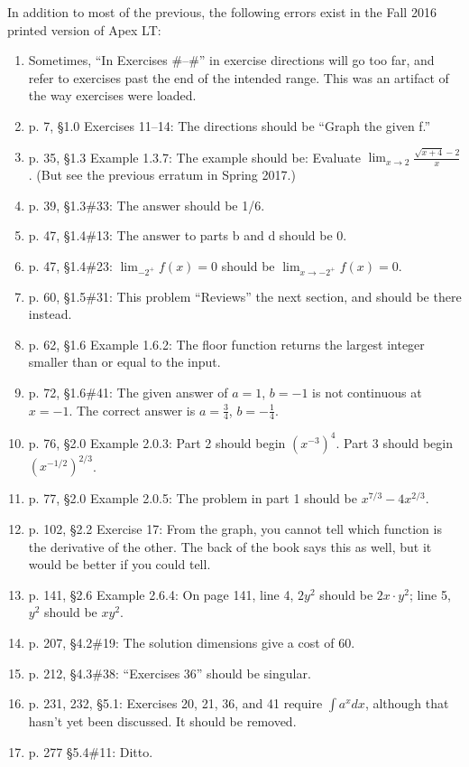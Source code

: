 \documentclass{amsart}
\newcommand{\ds}{\displaystyle}
\begin{document}
In addition to most of the previous, the following errors exist in the Fall 2016 printed version of Apex LT:
\begin{enumerate}
\item Sometimes, ``In Exercises \#--\#'' in exercise directions will go too far, and refer to exercises past the end of the intended range. This was an artifact of the way exercises were loaded.
\item p. 7, \S1.0 Exercises 11--14: The directions should be ``Graph the given f.''
\item p. 35, \S1.3 Example 1.3.7: The example should be: Evaluate $\ds\lim_{x\to2}\frac{\sqrt{x+4}-2}x$. (But see the previous erratum in Spring 2017.)
\item p. 39, \S1.3\#33: The answer should be 1/6.
\item p. 47, \S1.4\#13: The answer to parts b and d should be 0.
\item p. 47, \S1.4\#23: $\ds\lim_{-2^+}f(x)=0$ should be $\ds\lim_{x\to-2^+}f(x)=0$.
\item p. 60, \S1.5\#31: This problem ``Reviews'' the next section, and should be there instead.
\item p. 62, \S1.6 Example 1.6.2: The floor function returns the largest integer smaller than or equal to the input.
\item p. 72, \S1.6\#41: The given answer of $a=1$, $b=−1$ is not continuous at $x=−1$. The correct answer is $a=\frac34$, $b=−\frac14$.
\item p. 76, \S2.0 Example 2.0.3: Part 2 should begin $(x^{−3})^4$. Part 3 should begin $(x^{−1/2})^{2/3}$.
\item p. 77, \S2.0 Example 2.0.5: The problem in part 1 should be $x^{7/3}−4x^{2/3}$.
\item p. 102, \S2.2 Exercise 17: From the graph, you cannot tell which function is the derivative of the other. The back of the book says this as well, but it would be better if you could tell.
\item p. 141, \S2.6 Example 2.6.4: On page 141, line 4, $2y^2$ should be $2x\cdot y^2$; line 5, $y^2$ should be $xy^2$.
\item p. 207, \S4.2\#19: The solution dimensions give a cost of 60.
\item p. 212, \S4.3\#38: ``Exercises 36'' should be singular.
\item p. 231, 232, \S5.1: Exercises 20, 21, 36, and 41 require $\int a^x dx$, although that hasn't yet been discussed. It should be removed.
\item p. 277 \S5.4\#11: Ditto.

\end{enumerate}
\end{document}
